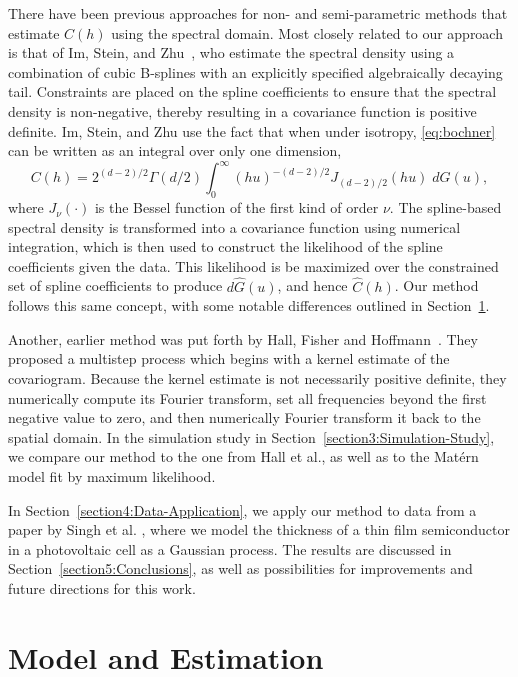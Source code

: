 \documentclass[12pt]{article}
\begin{document}
There have been previous approaches for non- and semi-parametric methods that estimate $C(h)$ using the spectral domain. Most closely related to our approach is that of Im, Stein, and Zhu~\cite{IM2007}, who estimate the spectral density using a combination of cubic B-splines with an explicitly specified algebraically decaying tail.   Constraints are placed on the spline coefficients to ensure that the spectral density is non-negative, thereby resulting in a covariance function is positive definite.  Im, Stein, and Zhu use the fact that when under isotropy, \eqref{eq:bochner} can be written as an integral over only one dimension,
\[
  C(h) = 2^{(d-2)/2}\Gamma(d/2) \int_0^\infty (hu)^{-(d-2)/2} J_{(d-2)/2}(hu) \; dG(u),
\]
where $J_\nu(\cdot)$ is the Bessel function of the first kind of order $\nu$. The spline-based spectral density is transformed into a covariance function using numerical integration, which is then used to construct the likelihood of the spline coefficients given the data.  This likelihood is be maximized over the constrained set of spline coefficients to produce $d\hat{G}(u)$, and hence $\hat{C}(h)$.  Our method follows this same concept, with some notable differences outlined in Section~\ref{section2:Procedure}.

Another, earlier method was put forth by Hall, Fisher and Hoffmann~\cite{Hall1994}. They proposed a multistep process which begins with a kernel estimate of the covariogram. Because the kernel estimate is not necessarily positive definite, they numerically compute its Fourier transform, set all frequencies beyond the first negative value to zero, and then numerically Fourier transform it back to the spatial domain. In the simulation study in Section~\ref{section3:Simulation-Study}, we compare our method to the one from Hall et al., as well as to the Mat\'ern model fit by maximum likelihood.

In Section~\ref{section4:Data-Application}, we apply our method to data from a paper by Singh et al. \cite{Singh2014}, where we model the thickness of a thin film semiconductor in a photovoltaic cell as a Gaussian process. The results are discussed in Section~\ref{section5:Conclusions}, as well as possibilities for improvements and future directions for this work.



\section{Model and Estimation}
\label{section2:Procedure}
\end{document}
